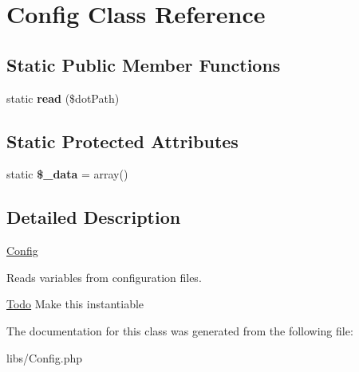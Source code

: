 \hypertarget{classConfig}{
\section{Config Class Reference}
\label{classConfig}
}
\subsection*{Static Public Member Functions}
\begin{DoxyCompactItemize}
\item 
\hypertarget{classConfig_a25bd8da6939a4173a5eb6b55281c02da}{
static {\bfseries read} (\$dotPath)}
\label{classConfig_a25bd8da6939a4173a5eb6b55281c02da}

\end{DoxyCompactItemize}
\subsection*{Static Protected Attributes}
\begin{DoxyCompactItemize}
\item 
\hypertarget{classConfig_aec55d9da7c6ae27a0568e01b0060b9ed}{
static {\bfseries \$\_\-data} = array()}
\label{classConfig_aec55d9da7c6ae27a0568e01b0060b9ed}

\end{DoxyCompactItemize}


\subsection{Detailed Description}
\hyperlink{classConfig}{Config}

Reads variables from configuration files. \begin{Desc}
\item[\hyperlink{todo__todo000001}{Todo}]Make this instantiable \end{Desc}


The documentation for this class was generated from the following file:\begin{DoxyCompactItemize}
\item 
libs/Config.php\end{DoxyCompactItemize}
